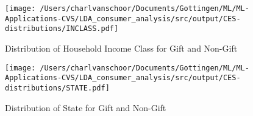 \begin{figure}
\caption{Distribution of Household Income Class for Gift and Non-Gift}\centering
\texttt{[image: /Users/charlvanschoor/Documents/Gottingen/ML/ML-Applications-CVS/LDA\_consumer\_analysis/src/output/CES-distributions/INCLASS.pdf]}
\end{figure}



\begin{figure}
\caption{Distribution of State for Gift and Non-Gift}\centering
\texttt{[image: /Users/charlvanschoor/Documents/Gottingen/ML/ML-Applications-CVS/LDA\_consumer\_analysis/src/output/CES-distributions/STATE.pdf]}
\end{figure}






